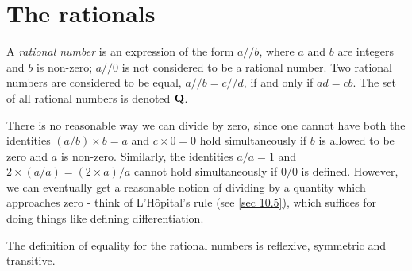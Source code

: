 \section{The rationals}\label{sec 4.2}

\begin{definition}\label{4.2.1}
  A \emph{rational number} is an expression of the form \(a // b\), where \(a\) and \(b\) are integers and \(b\) is non-zero;
  \(a // 0\) is not considered to be a rational number.
  Two rational numbers are considered to be equal, \(a // b = c // d\), if and only if \(ad = cb\).
  The set of all rational numbers is denoted \(\mathbf{Q}\).
\end{definition}

\begin{note}
  There is no reasonable way we can divide by zero, since one cannot have both the identities \((a / b) \times b = a\) and \(c \times 0 = 0\) hold simultaneously if \(b\) is allowed to be zero and \(a\) is non-zero.
  Similarly, the identities \(a / a = 1\) and \(2 \times (a / a) = (2 \times a) / a\) cannot hold simultaneously if \(0 / 0\) is defined.
  However, we can eventually get a reasonable notion of dividing by a quantity which approaches zero
  - think of L'H\^opital's rule (see \cref{sec 10.5}), which suffices for doing things like defining differentiation.
\end{note}

\begin{additional corollary}\label{ac 4.2.1}
The definition of equality for the rational numbers is reflexive, symmetric and transitive.
\end{additional corollary}

